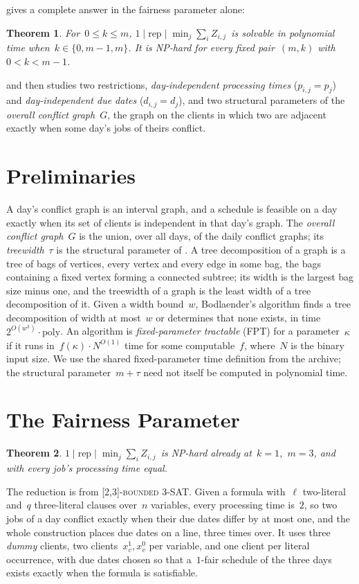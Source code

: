 \documentclass[11pt,a4paper]{article}
\newtheorem{theorem}{Theorem}
\theoremstyle{definition}
\newcommand{\threefield}[3]{$#1\mid#2\mid#3$}
\newcommand{\rep}{\mathrm{rep}}
\newcommand{\EQUIJIT}{\threefield{1}{\rep}{\min_j \sum_i Z_{i,j}}}
\newcommand{\SAT}{[2,3]-\textsc{bounded 3-SAT}}
\newcommand{\bigO}{O}
\begin{document}
\cite{HHIMS} gives a complete answer in the fairness parameter alone:

\setcounter{theorem}{0}
\begin{theorem}
\label{thm:1}
For~$0\le k\le m$, \EQUIJIT\ is solvable in polynomial time when~$k\in\{0,m-1,m\}$. It is NP-hard for every fixed pair~$(m,k)$ with~$0<k<m-1$.
\end{theorem}
and then studies two restrictions, \emph{day-independent processing times}
($p_{i,j}=p_j$) and \emph{day-independent due dates} ($d_{i,j}=d_j$), and two structural
parameters of the \emph{overall conflict graph}~$G$, the graph on the clients in which two
are adjacent exactly when some day's jobs of theirs conflict.

\section{Preliminaries}

A day's conflict graph is an interval graph, and a schedule is feasible on a day exactly
when its set of clients is independent in that day's graph. The \emph{overall conflict
graph}~$G$ is the union, over all days, of the daily conflict graphs; its \emph{treewidth}~$\tau$ is the structural parameter of .
A tree decomposition of a graph is a tree of bags of vertices, every vertex and every edge
in some bag, the bags containing a fixed vertex forming a connected subtree; its width is
the largest bag size minus one, and the treewidth of a graph is the least width of a tree
decomposition of it. Given a width bound~$w$, Bodlaender's algorithm finds a tree
decomposition of width at most~$w$ or determines that none exists, in
time~$2^{\bigO(w^3)}\cdot\mathrm{poly}$.
An algorithm is \emph{fixed-parameter tractable} (FPT) for a parameter~$\kappa$ if it runs
in~$f(\kappa)\cdot N^{\bigO(1)}$ time for some computable~$f$, where~$N$
is the binary input size. We use the shared fixed-parameter time definition
from the archive; the structural parameter~$m+\tau$ need not itself be
computed in polynomial time.

\section{The Fairness Parameter}
\label{sec:k}

\setcounter{theorem}{6}
\begin{theorem}
\label{thm:7}
\EQUIJIT\ is NP-hard already at~$k=1$,~$m=3$, and with every job's processing time equal.
\end{theorem}
The reduction is from \SAT. Given a formula with~$\ell$ two-literal and~$q$ three-literal
clauses over~$n$ variables, every processing time is~$2$, so two jobs of a day conflict
exactly when their due dates differ by at most one, and the whole construction places due
dates on a line, three times over. It uses three \emph{dummy} clients, two clients~$x_v^1,x_v^0$
per variable, and one client per literal occurrence, with due dates chosen so that a~$1$-fair schedule of the three days exists exactly when the formula is satisfiable.
\end{document}
